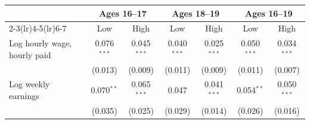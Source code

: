 \begin{tabular}{lcccccc}
\toprule
 & \multicolumn{2}{c}{Ages 16--17} & \multicolumn{2}{c}{Ages 18--19} & \multicolumn{2}{c}{Ages 16--19} \\
\cmidrule(lr){2-3}\cmidrule(lr){4-5}\cmidrule(lr){6-7}
 & Low & High & Low & High & Low & High \\
\midrule
Log hourly wage, hourly paid & 0.076$^{***}$ & 0.045$^{***}$ & 0.040$^{***}$ & 0.025$^{***}$ & 0.050$^{***}$ & 0.034$^{***}$ \\
 & (0.013) & (0.009) & (0.011) & (0.009) & (0.011) & (0.007) \\
Log weekly earnings & 0.070$^{**}$ & 0.065$^{***}$ & 0.047 & 0.041$^{***}$ & 0.054$^{**}$ & 0.050$^{***}$ \\
 & (0.035) & (0.025) & (0.029) & (0.014) & (0.026) & (0.016) \\
\bottomrule
\end{tabular}
